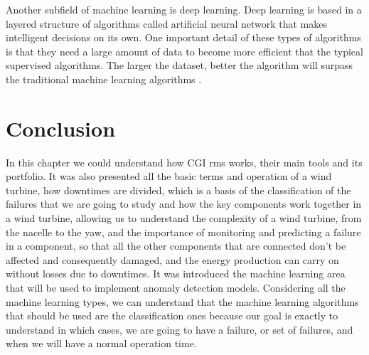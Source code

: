 Another subfield of machine learning is deep learning. Deep learning is based in a layered structure of algorithms called artificial neural network that makes intelligent decisions on its own. One important detail of these types of algorithms is that they need a large amount of data to become more efficient that the typical supervised algorithms. The larger the dataset, better the algorithm will surpass the traditional machine learning algorithms \cite{ML_Deep_Learning_2} \cite{ML_Deep_Learning}.


\section{Conclusion} 
\label{sub:if_you_use_this_template} 

In this chapter we could understand how CGI \acrshort{rms} works, their main tools and its portfolio. It was also presented all the basic terms and operation of a wind turbine, how downtimes are divided, which is a basis of the classification of the failures that we are going to study and how the key components work together in a wind turbine, allowing us to understand the complexity of a wind turbine, from the nacelle to the yaw, and the importance of monitoring and predicting a failure in a component, so that all the other components that are connected don't be affected and consequently damaged, and the energy production can carry on without losses due to downtimes. It was introduced the machine learning area that will be used to implement anomaly detection models. Considering all the machine learning types, we can understand that the machine learning algorithms that should be used are the classification ones because our goal is exactly to understand in which cases, we are going to have a failure, or set of failures, and when we will have a normal operation time.
